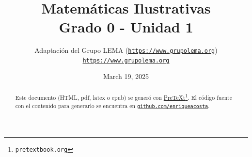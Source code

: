 \documentclass[twoside,10pt,]{article}
\title{Matemáticas Ilustrativas\\
{\large Grado 0 - Unidad 1}}
\author{Adaptación del Grupo LEMA (\href{https://www.grupolema.org}{\nolinkurl{https://www.grupolema.org}})\\
\href{https://www.grupolema.org}{\nolinkurl{https://www.grupolema.org}}
}
\date{March 19, 2025}
\begin{document}
\raggedbottom
\label{gra0-uni1}\hypertarget{gra0-uni1}{}
\maketitle
\thispagestyle{empty}
\renewcommand*{\abstractname}{Resumen}
\begin{abstract}
\end{abstract}
\renewcommand*{\abstractname}{Resumen}
\begin{abstract}
Este documento (HTML, pdf, latex o epub) se generó con \href{https://pretextbook.org}{PreTeXt}\footnote{\nolinkurl{pretextbook.org}\label{meta-source-2-2}}. El código fuente con el contenido para generarlo se encuentra en \href{https://github.com/enriqueacosta/IllustrativeMath-GrupoLEMA}{\nolinkurl{github.com/enriqueacosta}}.%
\end{abstract}
\renewcommand*{\abstractname}{Resumen}
\end{document}
